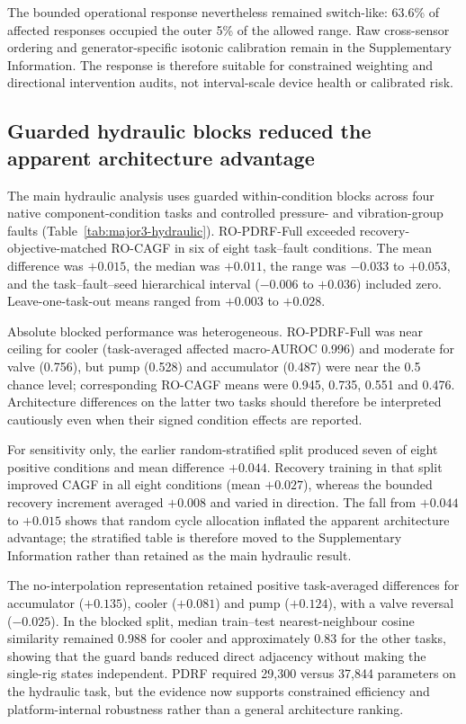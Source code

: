 \documentclass[11pt]{article}
\begin{document}
The bounded operational response nevertheless remained switch-like: 63.6\% of affected responses occupied the outer 5\% of the allowed range. Raw cross-sensor ordering and generator-specific isotonic calibration remain in the Supplementary Information. The response is therefore suitable for constrained weighting and directional intervention audits, not interval-scale device health or calibrated risk.

\subsection{Guarded hydraulic blocks reduced the apparent architecture advantage}

The main hydraulic analysis uses guarded within-condition blocks across four native component-condition tasks and controlled pressure- and vibration-group faults (Table~\ref{tab:major3-hydraulic}). RO-PDRF-Full exceeded recovery-objective-matched RO-CAGF in six of eight task--fault conditions. The mean difference was $+0.015$, the median was $+0.011$, the range was $-0.033$ to $+0.053$, and the task--fault--seed hierarchical interval ($-0.006$ to $+0.036$) included zero. Leave-one-task-out means ranged from $+0.003$ to $+0.028$.

Absolute blocked performance was heterogeneous. RO-PDRF-Full was near ceiling for cooler (task-averaged affected macro-AUROC 0.996) and moderate for valve (0.756), but pump (0.528) and accumulator (0.487) were near the 0.5 chance level; corresponding RO-CAGF means were 0.945, 0.735, 0.551 and 0.476. Architecture differences on the latter two tasks should therefore be interpreted cautiously even when their signed condition effects are reported.

For sensitivity only, the earlier random-stratified split produced seven of eight positive conditions and mean difference $+0.044$. Recovery training in that split improved CAGF in all eight conditions (mean $+0.027$), whereas the bounded recovery increment averaged $+0.008$ and varied in direction. The fall from $+0.044$ to $+0.015$ shows that random cycle allocation inflated the apparent architecture advantage; the stratified table is therefore moved to the Supplementary Information rather than retained as the main hydraulic result.

The no-interpolation representation retained positive task-averaged differences for accumulator ($+0.135$), cooler ($+0.081$) and pump ($+0.124$), with a valve reversal ($-0.025$). In the blocked split, median train--test nearest-neighbour cosine similarity remained 0.988 for cooler and approximately 0.83 for the other tasks, showing that the guard bands reduced direct adjacency without making the single-rig states independent. PDRF required 29,300 versus 37,844 parameters on the hydraulic task, but the evidence now supports constrained efficiency and platform-internal robustness rather than a general architecture ranking.
\end{document}
